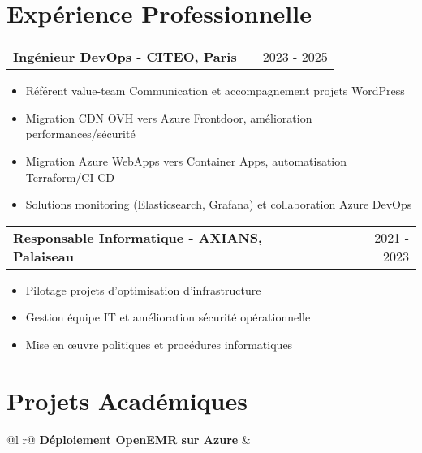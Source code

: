 \documentclass[a4paper,12pt]{article}
\makeatletter
\newenvironment{joblong}[2]
    {
    \begin{tabularx}{\linewidth}{@{}l X r@{}}
    \textbf{#1} & \hfill &  #2 \\[2pt]
    \end{tabularx}
    \begin{minipage}[t]{\linewidth}
    \begin{itemize}[nosep,after=\strut, leftmargin=1em, itemsep=2pt,label=--]
    }
    {
    \end{itemize}
    \end{minipage}    
    }
\makeatother
\begin{document}


\section{Expérience Professionnelle}


\begin{joblong}{Ingénieur DevOps - CITEO, Paris}{2023 - 2025}
\item Référent value-team Communication et accompagnement projets WordPress
\item Migration CDN OVH vers Azure Frontdoor, amélioration performances/sécurité
\item Migration Azure WebApps vers Container Apps, automatisation Terraform/CI-CD
\item Solutions monitoring (Elasticsearch, Grafana) et collaboration Azure DevOps
\end{joblong}


\begin{joblong}{Responsable Informatique - AXIANS, Palaiseau}{2021 - 2023}
\item Pilotage projets d'optimisation d'infrastructure
\item Gestion équipe IT et amélioration sécurité opérationnelle
\item Mise en œuvre politiques et procédures informatiques
\end{joblong}


  
\section{Projets Académiques}


\begin{tabularx}{\linewidth}{ @{}l r@{} }
\textbf{Déploiement OpenEMR sur Azure} & \hfill  \\
  \\
\end{tabularx}
\end{document}
